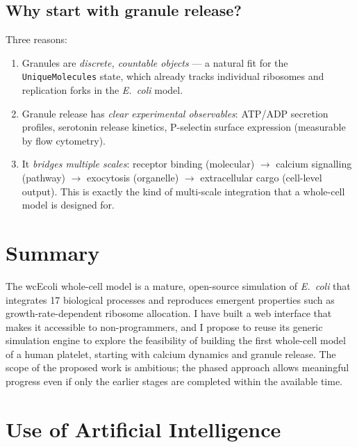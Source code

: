 \documentclass[11pt,a4paper]{article}
\begin{document}
\subsection{Why start with granule release?}

Three reasons:

\begin{enumerate}[nosep]
  \item Granules are \emph{discrete, countable objects} --- a natural fit for
    the \texttt{UniqueMolecules} state, which already tracks individual
    ribosomes and replication forks in the \textit{E.~coli} model.
  \item Granule release has \emph{clear experimental observables}: ATP/ADP
    secretion profiles, serotonin release kinetics, P-selectin surface
    expression (measurable by flow cytometry).
  \item It \emph{bridges multiple scales}: receptor binding (molecular) $\to$
    calcium signalling (pathway) $\to$ exocytosis (organelle) $\to$
    extracellular cargo (cell-level output).  This is exactly the kind of
    multi-scale integration that a whole-cell model is designed for.
\end{enumerate}


\section*{Summary}

The wcEcoli whole-cell model is a mature, open-source simulation of
\textit{E.~coli} that integrates 17 biological processes and reproduces
emergent properties such as growth-rate-dependent ribosome allocation.  I
have built a web interface that makes it accessible to non-programmers, and I
propose to reuse its generic simulation engine to explore the feasibility of
building the first whole-cell model of a human platelet, starting with calcium
dynamics and granule release.  The scope of the proposed work is ambitious;
the phased approach allows meaningful progress even if only the earlier stages
are completed within the available time.


\section*{Use of Artificial Intelligence}
\end{document}
